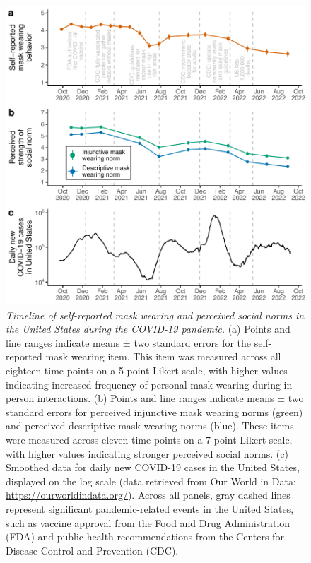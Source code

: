 \documentclass[
  man, donotrepeattitle,floatsintext]{apa6}
\begin{document}
\begin{figure}
\centering
\includegraphics{manuscript_files/figure-latex/plotTimeline-1.pdf}
\caption{\label{fig:plotTimeline}\emph{Timeline of self-reported mask wearing and perceived social norms in the United States during the COVID-19 pandemic.} (a) Points and line ranges indicate means ± two standard errors for the self-reported mask wearing item. This item was measured across all eighteen time points on a 5-point Likert scale, with higher values indicating increased frequency of personal mask wearing during in-person interactions. (b) Points and line ranges indicate means ± two standard errors for perceived injunctive mask wearing norms (green) and perceived descriptive mask wearing norms (blue). These items were measured across eleven time points on a 7-point Likert scale, with higher values indicating stronger perceived social norms. (c) Smoothed data for daily new COVID-19 cases in the United States, displayed on the log scale (data retrieved from Our World in Data; \url{https://ourworldindata.org/}). Across all panels, gray dashed lines represent significant pandemic-related events in the United States, such as vaccine approval from the Food and Drug Administration (FDA) and public health recommendations from the Centers for Disease Control and Prevention (CDC).}
\end{figure}
\end{document}
